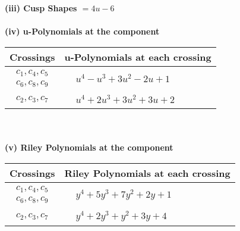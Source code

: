 \documentclass[1p]{elsarticle_modified}
\theoremstyle{definition}
\begin{document}
\flushleft \textbf{(iii) Cusp Shapes $= 4 u-6$}\\~\\
\newpage\renewcommand{\arraystretch}{1}
\flushleft \textbf{(iv) u-Polynomials at the component}\newline \\
\begin{tabular}{m{50pt}|m{274pt}}
Crossings & \hspace{64pt}u-Polynomials at each crossing \\
\hline $$\begin{aligned}c_{1},c_{4},c_{5}\\c_{6},c_{8},c_{9}\end{aligned}$$&$\begin{aligned}
&u^4- u^3+3 u^2-2 u+1
\end{aligned}$\\
\hline $$\begin{aligned}c_{2},c_{3},c_{7}\end{aligned}$$&$\begin{aligned}
&u^4+2 u^3+3 u^2+3 u+2
\end{aligned}$\\
\hline
\end{tabular}\\~\\
\newpage\renewcommand{\arraystretch}{1}
\flushleft \textbf{(v) Riley Polynomials at the component}\newline \\
\begin{tabular}{m{50pt}|m{274pt}}
Crossings & \hspace{64pt}Riley Polynomials at each crossing \\
\hline $$\begin{aligned}c_{1},c_{4},c_{5}\\c_{6},c_{8},c_{9}\end{aligned}$$&$\begin{aligned}
&y^4+5 y^3+7 y^2+2 y+1
\end{aligned}$\\
\hline $$\begin{aligned}c_{2},c_{3},c_{7}\end{aligned}$$&$\begin{aligned}
&y^4+2 y^3+y^2+3 y+4
\end{aligned}$\\
\hline
\end{tabular}\\~\\
\end{document}
